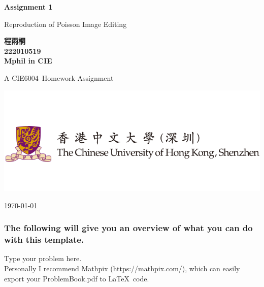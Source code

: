 \documentclass[10pt, a4paper]{article}%
\newcommand\course{CIE6004}                            %
\newcommand\hwnumber{1}                                 %
\newcommand\Information{程雨桐\\222010519\\Mphil in CIE} %
\begin{document}
\begin{titlepage}
    \begin{center}
        \vspace*{3cm}
            
        \Huge
        \textbf{Assignment \hwnumber \ }
            
        \vspace{1cm}
        \huge
        
        Reproduction of Poisson Image Editing
            
        \vspace{1.5cm}
        \Large
            
        \textbf{\Information \ }                      %
        
            
        \vfill
        
        A \course \ Homework Assignment
            
        \vspace{1cm}
            
        \includegraphics[width=1\textwidth]{logo.png}
        \\
        
        \Large
        
        \today
            
    \end{center}
\end{titlepage}


\newpage

\subsubsection*{The following will give you an overview of what you can do with this template.}

\begin{Problem}
Type your problem here. \\
Personally I recommend Mathpix (https://mathpix.com/), which can easily export your ProblemBook.pdf to \LaTeX \ code.
\end{Problem}
\end{document}
